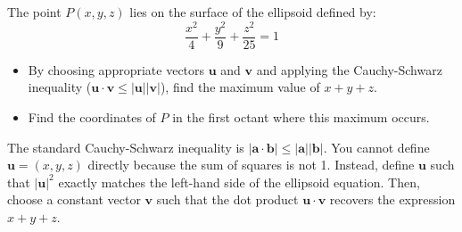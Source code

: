\begin{problem}
The point $P(x, y, z)$ lies on the surface of the ellipsoid defined by:
\[ \frac{x^2}{4} + \frac{y^2}{9} + \frac{z^2}{25} = 1 \]
\begin{itemize}
    \item[(i)] By choosing appropriate vectors $\mathbf{u}$ and $\mathbf{v}$ and applying the Cauchy-Schwarz inequality ($\mathbf{u} \cdot \mathbf{v} \le |\mathbf{u}||\mathbf{v}|$), find the maximum value of $x + y + z$.
    \item[(ii)] Find the coordinates of $P$ in the first octant where this maximum occurs.
\end{itemize}

\begin{center}
\end{center}
\end{problem}

\begin{hint}
The standard Cauchy-Schwarz inequality is $|\mathbf{a} \cdot \mathbf{b}| \le |\mathbf{a}| |\mathbf{b}|$.
You cannot define $\mathbf{u} = (x, y, z)$ directly because the sum of squares is not 1.
Instead, define $\mathbf{u}$ such that $|\mathbf{u}|^2$ exactly matches the left-hand side of the ellipsoid equation.
Then, choose a constant vector $\mathbf{v}$ such that the dot product $\mathbf{u} \cdot \mathbf{v}$ recovers the expression $x + y + z$.
\end{hint}

